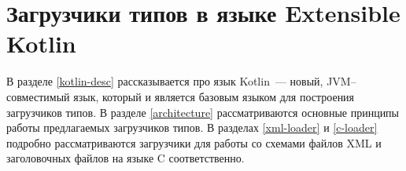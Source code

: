 \section{Загрузчики типов в языке Extensible Kotlin}
В разделе \ref{kotlin-desc} рассказывается про язык Kotlin~--- новый, JVM--совместимый язык, который и является базовым языком для построения загрузчиков типов.
В разделе \ref{architecture} рассматриваются основные принципы работы предлагаемых загрузчиков типов.
В разделах \ref{xml-loader} и \ref{c-loader} подробно рассматриваются загрузчики для работы со схемами файлов XML и заголовочных файлов на языке C соответственно.





